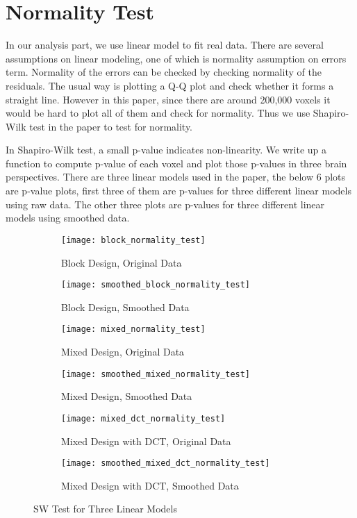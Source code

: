 

\section{Normality Test}


In our analysis part, we use linear model to fit real data. There are several
assumptions on linear modeling, one of which is normality assumption on errors 
term. Normality of the errors can be checked by checking normality of the 
residuals. The usual way is plotting a Q-Q plot and check whether it forms a 
straight line. However in this paper, since there are around 200,000 voxels
it would be hard to plot all of them and check for normality. Thus we use 
Shapiro-Wilk test in the paper to test for normality. \par

In Shapiro-Wilk test, a small p-value indicates non-linearity. We write up a
function to compute p-value of each voxel and plot those p-values in three
brain perspectives. There are three linear models used in the paper, the below
6 plots are p-value plots, first three of them are p-values for three different
linear models using raw data. The other three plots are p-values for three 
different linear models using smoothed data. \par



\begin{figure}[h!]
\begin{subfigure}{.5\textwidth}
  \centering
  \texttt{[image: block\_normality\_test]}
  \caption{Block Design, Original Data}
  \label{fig:block_origin}
\end{subfigure}%
\begin{subfigure}{.5\textwidth}
  \centering
  \texttt{[image: smoothed\_block\_normality\_test]}
  \caption{Block Design, Smoothed Data}
  \label{fig:block_smoothed}
\end{subfigure}
\begin{subfigure}{.5\textwidth}
  \centering
  \texttt{[image: mixed\_normality\_test]}
  \caption{Mixed Design, Original Data}
  \label{fig:mixed_origin}
\end{subfigure}%
\begin{subfigure}{.5\textwidth}
  \centering
  \texttt{[image: smoothed\_mixed\_normality\_test]}
  \caption{Mixed Design, Smoothed Data}
  \label{fig:mixed_smoothed}
\end{subfigure}
\begin{subfigure}{.5\textwidth}
  \centering
  \texttt{[image: mixed\_dct\_normality\_test]}
  \caption{Mixed Design with DCT, Original Data}
  \label{fig:dct_origin}
\end{subfigure}%
\begin{subfigure}{.5\textwidth}
  \centering
  \texttt{[image: smoothed\_mixed\_dct\_normality\_test]}
  \caption{Mixed Design with DCT, Smoothed Data}
  \label{fig:dct_origin}
\end{subfigure}
\caption{SW Test for Three Linear Models\label{fig:swtest}}
\end{figure}




